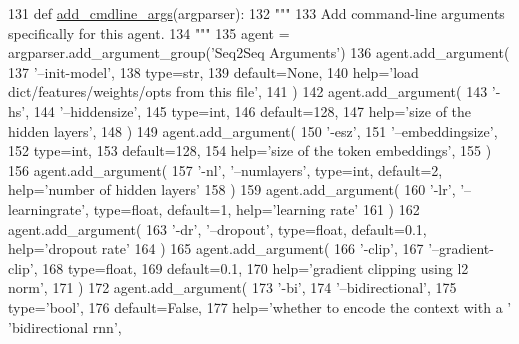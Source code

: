 \begin{DoxyCode}
131     \textcolor{keyword}{def }\hyperlink{namespaceparlai_1_1agents_1_1drqa_1_1config_a62fdd5554f1da6be0cba185271058320}{add\_cmdline\_args}(argparser):
132         \textcolor{stringliteral}{"""}
133 \textcolor{stringliteral}{        Add command-line arguments specifically for this agent.}
134 \textcolor{stringliteral}{        """}
135         agent = argparser.add\_argument\_group(\textcolor{stringliteral}{'Seq2Seq Arguments'})
136         agent.add\_argument(
137             \textcolor{stringliteral}{'--init-model'},
138             type=str,
139             default=\textcolor{keywordtype}{None},
140             help=\textcolor{stringliteral}{'load dict/features/weights/opts from this file'},
141         )
142         agent.add\_argument(
143             \textcolor{stringliteral}{'-hs'},
144             \textcolor{stringliteral}{'--hiddensize'},
145             type=int,
146             default=128,
147             help=\textcolor{stringliteral}{'size of the hidden layers'},
148         )
149         agent.add\_argument(
150             \textcolor{stringliteral}{'-esz'},
151             \textcolor{stringliteral}{'--embeddingsize'},
152             type=int,
153             default=128,
154             help=\textcolor{stringliteral}{'size of the token embeddings'},
155         )
156         agent.add\_argument(
157             \textcolor{stringliteral}{'-nl'}, \textcolor{stringliteral}{'--numlayers'}, type=int, default=2, help=\textcolor{stringliteral}{'number of hidden layers'}
158         )
159         agent.add\_argument(
160             \textcolor{stringliteral}{'-lr'}, \textcolor{stringliteral}{'--learningrate'}, type=float, default=1, help=\textcolor{stringliteral}{'learning rate'}
161         )
162         agent.add\_argument(
163             \textcolor{stringliteral}{'-dr'}, \textcolor{stringliteral}{'--dropout'}, type=float, default=0.1, help=\textcolor{stringliteral}{'dropout rate'}
164         )
165         agent.add\_argument(
166             \textcolor{stringliteral}{'-clip'},
167             \textcolor{stringliteral}{'--gradient-clip'},
168             type=float,
169             default=0.1,
170             help=\textcolor{stringliteral}{'gradient clipping using l2 norm'},
171         )
172         agent.add\_argument(
173             \textcolor{stringliteral}{'-bi'},
174             \textcolor{stringliteral}{'--bidirectional'},
175             type=\textcolor{stringliteral}{'bool'},
176             default=\textcolor{keyword}{False},
177             help=\textcolor{stringliteral}{'whether to encode the context with a '} \textcolor{stringliteral}{'bidirectional rnn'},

\end{DoxyCode}
